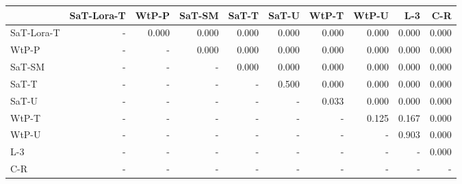 \begin{tabular}{lrrrrrrrrr}
\toprule
 & SaT-Lora-T & WtP-P & SaT-SM & SaT-T & SaT-U & WtP-T & WtP-U & L-3 & C-R \\
\midrule
SaT-Lora-T & - & 0.000 & 0.000 & 0.000 & 0.000 & 0.000 & 0.000 & 0.000 & 0.000 \\
WtP-P & - & - & 0.000 & 0.000 & 0.000 & 0.000 & 0.000 & 0.000 & 0.000 \\
SaT-SM & - & - & - & 0.000 & 0.000 & 0.000 & 0.000 & 0.000 & 0.000 \\
SaT-T & - & - & - & - & 0.500 & 0.000 & 0.000 & 0.000 & 0.000 \\
SaT-U & - & - & - & - & - & 0.033 & 0.000 & 0.000 & 0.000 \\
WtP-T & - & - & - & - & - & - & 0.125 & 0.167 & 0.000 \\
WtP-U & - & - & - & - & - & - & - & 0.903 & 0.000 \\
L-3 & - & - & - & - & - & - & - & - & 0.000 \\
C-R & - & - & - & - & - & - & - & - & - \\
\bottomrule
\end{tabular}

